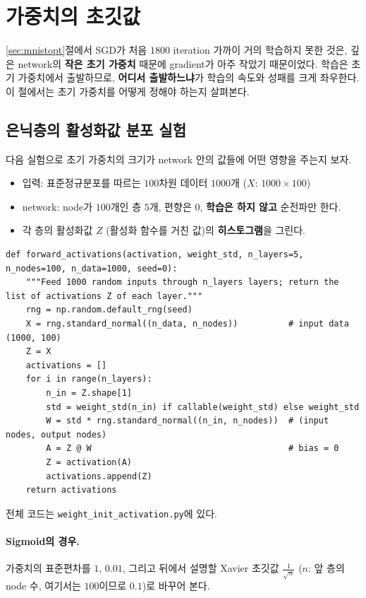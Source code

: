 \documentclass[11pt,a4paper]{article}
\begin{document}
\section{가중치의 초깃값}\label{sec:init}

\ref{sec:mnistopt}절에서 SGD가 처음 $1800$ iteration 가까이 거의 학습하지 못한 것은,
깊은 network의 \textbf{작은 초기 가중치} 때문에 gradient가 아주 작았기 때문이었다.
학습은 초기 가중치에서 출발하므로, \textbf{어디서 출발하느냐}가 학습의 속도와 성패를 크게 좌우한다.
이 절에서는 초기 가중치를 어떻게 정해야 하는지 살펴본다.

\subsection{은닉층의 활성화값 분포 실험}

다음 실험으로 초기 가중치의 크기가 network 안의 값들에 어떤 영향을 주는지 보자.
\begin{itemize}[leftmargin=1.8em]
\item 입력: 표준정규분포를 따르는 $100$차원 데이터 $1000$개 ($X$: $1000\times100$)
\item network: node가 $100$개인 층 $5$개, 편향은 $0$, \textbf{학습은 하지 않고} 순전파만 한다.
\item 각 층의 활성화값 $Z$ (활성화 함수를 거친 값)의 \textbf{히스토그램}을 그린다.
\end{itemize}

\begin{lstlisting}
def forward_activations(activation, weight_std, n_layers=5, n_nodes=100, n_data=1000, seed=0):
    """Feed 1000 random inputs through n_layers layers; return the list of activations Z of each layer."""
    rng = np.random.default_rng(seed)
    X = rng.standard_normal((n_data, n_nodes))          # input data (1000, 100)
    Z = X
    activations = []
    for i in range(n_layers):
        n_in = Z.shape[1]
        std = weight_std(n_in) if callable(weight_std) else weight_std
        W = std * rng.standard_normal((n_in, n_nodes))  # (input nodes, output nodes)
        A = Z @ W                                       # bias = 0
        Z = activation(A)
        activations.append(Z)
    return activations
\end{lstlisting}
전체 코드는 \texttt{weight\_init\_activation.py}에 있다.

\paragraph{Sigmoid의 경우.}
가중치의 표준편차를 $1$, $0.01$, 그리고 뒤에서 설명할 Xavier 초깃값 $\frac{1}{\sqrt n}$
($n$: 앞 층의 node 수, 여기서는 $100$이므로 $0.1$)로 바꾸어 본다.
\end{document}
